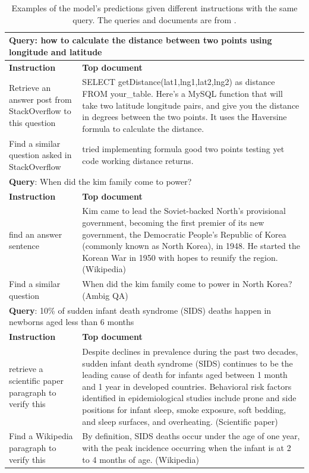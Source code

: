 \begin{table}[t!]
\renewcommand{\arraystretch}{1.2}
\setlength{\tabcolsep}{2pt}
\footnotesize
    \centering
    \begin{tabular}{p{4cm}|p{11cm}}%
\toprule
\multicolumn{2}{l}{\textbf{Query}: how to calculate the distance between two points using longitude and latitude} \\\hline
\textbf{Instruction} & \textbf{Top document}\\\midrule 
 Retrieve an answer post from StackOverflow to this question & SELECT getDistance(lat1,lng1,lat2,lng2) as distance FROM your\_table. Here's a MySQL function that will take two latitude longitude pairs, and give you the distance in degrees between the two points. It uses the Haversine formula to calculate the distance. \\
 Find a similar question asked in StackOverflow & tried implementing formula good two points testing yet code working distance returns. \\\toprule
 \multicolumn{2}{l}{\textbf{Query}: When did the kim family come to power? } \\\hline
\textbf{Instruction} & \textbf{Top document}\\\midrule 
find an answer sentence & Kim came to lead the Soviet-backed North's provisional government, becoming the first premier of its new government, the Democratic People's Republic of Korea (commonly known as North Korea), in 1948. He started the Korean War in 1950 with hopes to reunify the region. (Wikipedia) \\
Find a similar question & When did the kim family come to power in North Korea? (Ambig QA) \\\toprule
  \multicolumn{2}{l}{\textbf{Query}: 10\% of sudden infant death syndrome (SIDS) deaths happen in newborns aged less than 6 months } \\\hline
\textbf{Instruction} & \textbf{Top document}\\\midrule 
retrieve a scientific paper paragraph to verify this & Despite declines in prevalence during the past two decades, sudden infant death syndrome (SIDS) continues to be the leading cause of death for infants aged between 1 month and 1 year in developed countries. Behavioral risk factors identified in epidemiological studies include prone and side positions for infant sleep, smoke exposure, soft bedding, and sleep surfaces, and overheating. (Scientific paper) \\
Find a Wikipedia paragraph to verify this & By definition, SIDS deaths occur under the age of one year, with the peak incidence occurring when the infant is at 2 to 4 months of age. (Wikipedia) \\
\bottomrule
 \end{tabular}
    \caption{Examples of the model's predictions given different instructions with the same query. The queries and documents are from \task. }\label{tab:cross_task_examples}
\end{table}

